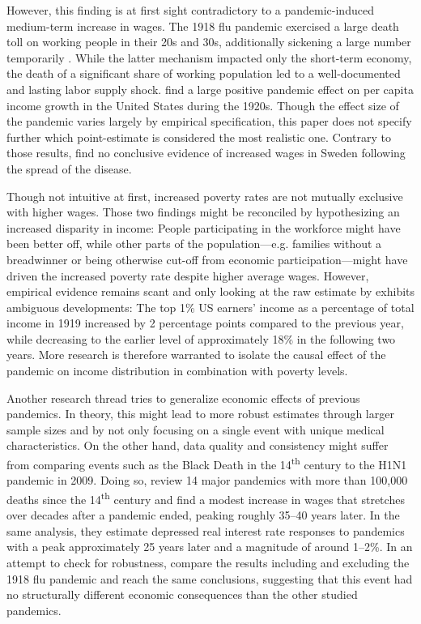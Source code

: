 \documentclass[12pt,a4paper]{article}
\begin{document}
However, this finding is at first sight contradictory to a pandemic-induced medium-term increase in wages.
The 1918 flu pandemic exercised a large death toll on working people in their 20s and 30s, additionally sickening a large number temporarily \citep{taubenberger1918InfluenzaMother2006}. 
While the latter mechanism impacted only the short-term economy,
the death of a significant share of working population led to a well-documented and lasting labor supply shock.
\cite{brainerdEconomicEffects19182003} find a large positive pandemic effect on per capita income growth in the United States during the 1920s.
Though the effect size of the pandemic varies largely by empirical specification, this paper does not specify further which point-estimate is considered the most realistic one.
Contrary to those results, \cite{karlssonImpact1918Spanish2014} find no conclusive evidence of increased wages in Sweden following the spread of the disease.

Though not intuitive at first, increased poverty rates are not mutually exclusive with higher wages.
Those two findings might be reconciled by hypothesizing an increased disparity in income:
People participating in the workforce might have been better off, while other parts of the population---e.g. families without a breadwinner or being otherwise cut-off from economic participation---might have driven the increased poverty rate despite higher average wages.
However, empirical evidence remains scant and only looking at the raw estimate by \cite{pikettyDistributionalNationalAccounts2018} exhibits ambiguous developments:
The top 1\% US earners' income as a percentage of total income in 1919 increased by 2 percentage points compared to the previous year, while decreasing to the earlier level of approximately 18\% in the following two years.
More research is therefore warranted to isolate the causal effect of the pandemic on income distribution in combination with poverty levels.

Another research thread tries to generalize economic effects of previous pandemics.
In theory, this might lead to more robust estimates through larger sample sizes and by not only focusing on a single event with unique medical characteristics.
On the other hand, data quality and consistency might suffer from comparing events such as the Black Death in the 14\textsuperscript{th} century to the H1N1 pandemic in 2009.
Doing so, \cite{jordaLongerrunEconomicConsequences2020} review 14 major pandemics with more than 100,000 deaths since the 14\textsuperscript{th} century and find a modest increase in wages that stretches over decades after a pandemic ended, peaking roughly 35--40 years later.
In the same analysis, they estimate depressed real interest rate responses to pandemics with a peak approximately 25 years later and a magnitude of around 1--2\%.
In an attempt to check for robustness, \cite{jordaLongerrunEconomicConsequences2020} compare the results including and excluding the 1918 flu pandemic and reach the same conclusions, suggesting that this event had no structurally different economic consequences than the other studied pandemics.
\end{document}
